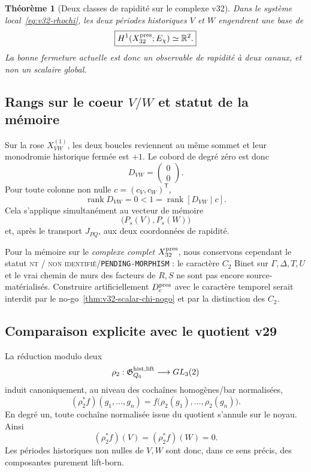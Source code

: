 \documentclass[11pt,a4paper]{article}
\newtheorem{theorem}{Théorème}[section]
\newcommand{\rank}{\operatorname{rank}}
\newcommand{\statusNT}{\textsc{nt / non identifié}}
\newcommand{\certPending}{\texttt{PENDING-MORPHISM}}
\begin{document}
\begin{theorem}[Deux classes de rapidité sur le complexe v32]\label{thm:v32-rank2-H1}
Dans le système local~\eqref{eq:v32-rhochi}, les deux périodes historiques $V$ et $W$ engendrent
une base de
\[
 \boxed{H^1(X_{32}^{\rm pres};E_\chi)\simeq\mathbb R^2.}
\]
La bonne fermeture actuelle est donc un observable de rapidité \emph{à deux canaux}, et non un
scalaire global.
\end{theorem}

\subsection{Rangs sur le coeur $V/W$ et statut de la mémoire}

Sur la rose $X_{VW}^{(1)}$, les deux boucles reviennent au même sommet et leur monodromie
historique fermée est $+1$. Le cobord de degré zéro est donc
\begin{equation}\label{eq:v32-core-D}
 \boxed{D_{VW}=\begin{pmatrix}0\\0\end{pmatrix}.}
\end{equation}
Pour toute colonne non nulle $c=(c_V,c_W)^{\mathsf T}$,
\begin{equation}\label{eq:v32-core-rank-test}
 \boxed{
 \rank D_{VW}=0
 <1=\rank[D_{VW}\mid c].}
\end{equation}
Cela s'applique simultanément au vecteur de mémoire
\[
 \bigl(P_s(V),P_s(W)\bigr)
\]
et, après le transport $J_{PQ}$, aux deux coordonnées de rapidité.

Pour la mémoire sur le \emph{complexe complet} $X_{32}^{\rm pres}$, nous conservons cependant le
statut \statusNT{}/\certPending{} : le caractère $C_2$ Binet sur
$\Gamma,\Delta,T,U$ et le vrai chemin de murs des facteurs de $R,S$ ne sont pas encore
source-matérialisés. Construire artificiellement $D_c^{\rm pres}$ avec le caractère temporel serait
interdit par le no-go~\ref{thm:v32-scalar-chi-nogo} et par la distinction des $C_2$.

\subsection{Comparaison explicite avec le quotient v29}

La réduction modulo deux
\[
 \rho_2:\mathfrak G_{Q_0}^{\rm hist,lift}\longrightarrow GL_3(2)
\]
induit canoniquement, au niveau des cochaînes homogènes/bar normalisées,
\begin{equation}\label{eq:v32-bar-pullback}
 \boxed{
 (\rho_2^*f)(g_1,\ldots,g_n)
 =f\bigl(\rho_2(g_1),\ldots,\rho_2(g_n)\bigr).}
\end{equation}
En degré un, toute cochaîne normalisée issue du quotient s'annule sur le noyau. Ainsi
\begin{equation}\label{eq:v32-kernel-pullback-zero}
 \boxed{
 (\rho_2^*f)(V)=(\rho_2^*f)(W)=0.}
\end{equation}
Les périodes historiques non nulles de $V,W$ sont donc, dans ce sens précis, des composantes
purement lift-born.
\end{document}
